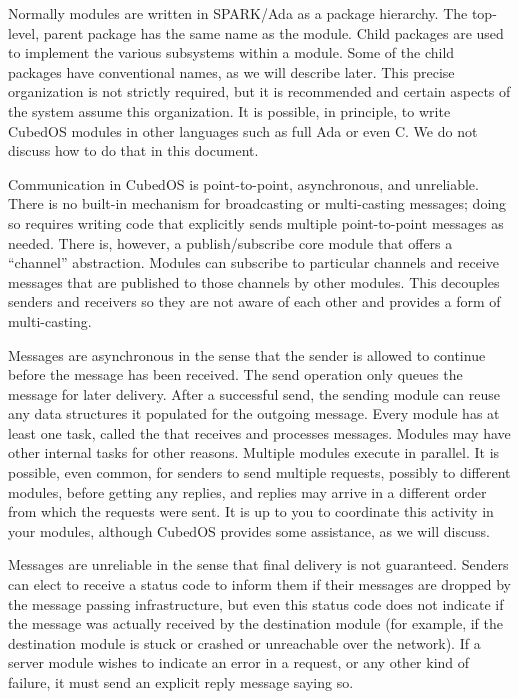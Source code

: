 \documentclass{scrreprt}
\begin{document}
Normally modules are written in SPARK/Ada as a package hierarchy. The top-level, parent package
has the same name as the module. Child packages are used to implement the various subsystems
within a module. Some of the child packages have conventional names, as we will describe later.
This precise organization is not strictly required, but it is recommended and certain aspects of
the system assume this organization. It is possible, in principle, to write CubedOS modules in
other languages such as full Ada or even C. We do not discuss how to do that in this document.

Communication in CubedOS is point-to-point, asynchronous, and unreliable. There is no built-in
mechanism for broadcasting or multi-casting messages; doing so requires writing code that
explicitly sends multiple point-to-point messages as needed. There is, however, a
publish/subscribe core module that offers a ``channel'' abstraction. Modules can subscribe to
particular channels and receive messages that are published to those channels by other modules.
This decouples senders and receivers so they are not aware of each other and provides a form of
multi-casting.

Messages are asynchronous in the sense that the sender is allowed to continue before the message
has been received. The send operation only queues the message for later delivery. After a
successful send, the sending module can reuse any data structures it populated for the outgoing
message. Every module has at least one task, called the  that receives
and processes messages. Modules may have other internal tasks for other reasons. Multiple
modules execute in parallel. It is possible, even common, for senders to send multiple requests,
possibly to different modules, before getting any replies, and replies may arrive in a different
order from which the requests were sent. It is up to you to coordinate this activity in your
modules, although CubedOS provides some assistance, as we will discuss.

Messages are unreliable in the sense that final delivery is not guaranteed. Senders can elect to
receive a status code to inform them if their messages are dropped by the message passing
infrastructure, but even this status code does not indicate if the message was actually received
by the destination module (for example, if the destination module is stuck or crashed or
unreachable over the network). If a server module wishes to indicate an error in a request, or
any other kind of failure, it must send an explicit reply message saying so.
\end{document}

